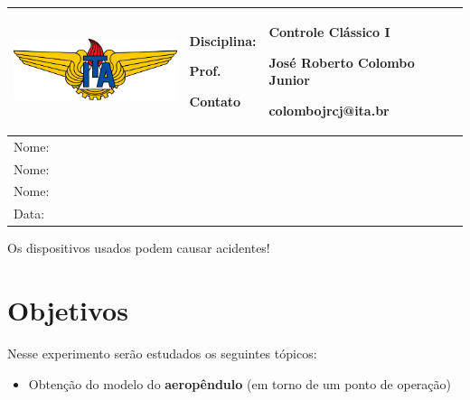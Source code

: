 \documentclass[a4paper,12pt]{exam}
\makeatletter
\newcommand{\materia}{Controle Clássico I}
\newcommand{\professor}{José Roberto Colombo Junior}
\newcommand{\email}{colombojrcj@ita.br}
\makeatother
\begin{document}
\begin{center}
  {\large \textbf{}} \\
  \vspace{5mm}
  
  \begin{tabular}{L{55mm}L{20mm}L{90mm}}\hline
    \includegraphics[width=50mm]{figs/logo.png}
    &     
    Disciplina: 
    
    Prof.

    Contato
    &
    \materia
    
    \professor

    \email
    \\ \hline
    
    Nome: \vspace*{8mm} & & \\ \hline
    Nome: \vspace*{8mm} & & \\ \hline
    Nome: \vspace*{8mm} & & \\ \hline
    Data: \vspace*{8mm} & & \\ \hline
  \end{tabular}
  
  \bigskip
\end{center}

\begin{cuidado}{}{}
    Os dispositivos usados podem causar acidentes!
\end{cuidado}

\section{Objetivos}

Nesse experimento serão estudados os seguintes tópicos:

\begin{itemize}
    \item Obtenção do modelo do \textbf{aeropêndulo }(em torno de um ponto de operação)
\end{itemize}
\end{document}
